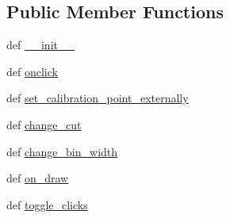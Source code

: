 \subsection*{Public Member Functions}
\begin{DoxyCompactItemize}
\item 
def \hyperlink{classWidgets_1_1MatplotlibCalibrationCurveFittingWidget_1_1MatplotlibCalibrationCurveFittingWidget_a61247760fbadfec08384c149b4055bba}{\-\_\-\-\_\-init\-\_\-\-\_\-}
\item 
def \hyperlink{classWidgets_1_1MatplotlibCalibrationCurveFittingWidget_1_1MatplotlibCalibrationCurveFittingWidget_a60be16b569b6aa80d08b228dd11ec886}{onclick}
\item 
def \hyperlink{classWidgets_1_1MatplotlibCalibrationCurveFittingWidget_1_1MatplotlibCalibrationCurveFittingWidget_a154426d513e47e19612c4e6750baf32c}{set\-\_\-calibration\-\_\-point\-\_\-externally}
\item 
def \hyperlink{classWidgets_1_1MatplotlibCalibrationCurveFittingWidget_1_1MatplotlibCalibrationCurveFittingWidget_ae7f878f52f776c6244b7d8eb67fafc16}{change\-\_\-cut}
\item 
def \hyperlink{classWidgets_1_1MatplotlibCalibrationCurveFittingWidget_1_1MatplotlibCalibrationCurveFittingWidget_a0d446b5d1d8a7a57df9127d1d6579ce9}{change\-\_\-bin\-\_\-width}
\item 
def \hyperlink{classWidgets_1_1MatplotlibCalibrationCurveFittingWidget_1_1MatplotlibCalibrationCurveFittingWidget_a608876b8f2dc34c35c142f5b6f2abde2}{on\-\_\-draw}
\item 
def \hyperlink{classWidgets_1_1MatplotlibCalibrationCurveFittingWidget_1_1MatplotlibCalibrationCurveFittingWidget_a4e741d993345a895a347d86a80195a91}{toggle\-\_\-clicks}
\end{DoxyCompactItemize}
